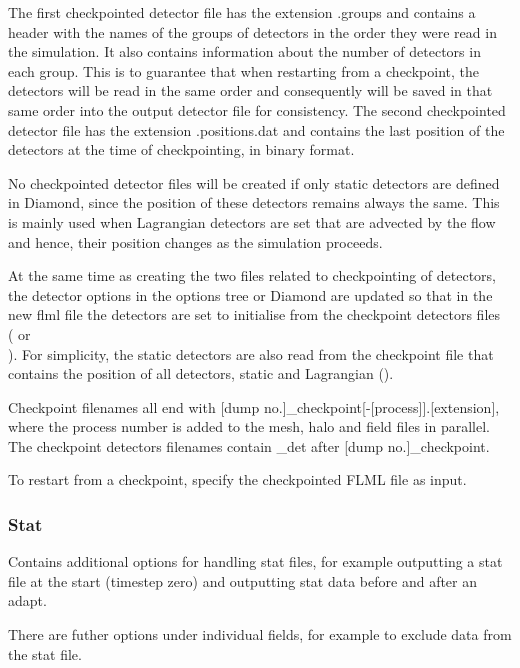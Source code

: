 The first checkpointed detector file has the extension .groups and contains
a header with the names of the groups of detectors in the order they were
read in the simulation. It also contains information about the number of
detectors in each group. This is to guarantee that when restarting from a
checkpoint, the detectors will be read in the same order and consequently
will be saved in that same order into the output detector file for
consistency.  The second checkpointed detector file has the extension
.positions.dat and contains the last position of the detectors at the time 
of checkpointing, in binary format.

No checkpointed detector files will be created if only static detectors are
defined in Diamond, since the position of these detectors remains always the
same. This is mainly used when Lagrangian detectors are set that are
advected by the flow and hence, their position changes as the simulation
proceeds.

At the same time as creating the two files related to checkpointing of
detectors, the detector options in the options tree or Diamond are updated
so that in the new flml file the detectors are set to initialise from the
checkpoint detectors files \\
( or \\
). For
simplicity, the static detectors are also read from the checkpoint file that
contains the position of all detectors, static and Lagrangian
().

Checkpoint filenames all end with [dump
no.]\_checkpoint[-[process]].[extension], where the process number is added
to the mesh, halo and field files in parallel.  The checkpoint detectors
filenames contain \_det after [dump no.]\_checkpoint.

To restart from a checkpoint, specify the checkpointed FLML file as input.

\subsubsection{Stat}
Contains additional options for handling stat files, for example outputting
a stat file at the start (timestep zero) and outputting stat data before and
after an adapt.

There are futher options under individual fields, for example to exclude data from the stat file.

